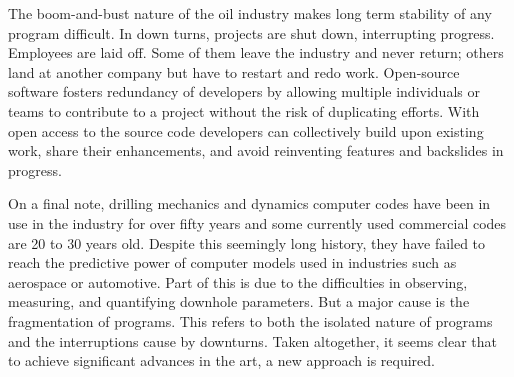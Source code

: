 The boom-and-bust nature of the oil industry makes long term stability of any program difficult.  In down turns, projects are shut down, interrupting progress.  Employees are laid off.  Some of them leave the industry and never return; others land at another company but have to restart and redo work.  Open-source software fosters redundancy of developers by allowing multiple individuals or teams to contribute to a project without the risk of duplicating efforts.  With open access to the source code developers can collectively build upon existing work, share their enhancements, and avoid reinventing features and backslides in progress.


On a final note, drilling mechanics and dynamics computer codes have been in use in the industry for over fifty years and some currently used commercial codes are 20 to 30 years old.  Despite this seemingly long history, they have failed to reach the predictive power of computer models used in industries such as aerospace or automotive.  Part of this is due to the difficulties in observing, measuring, and quantifying downhole parameters.  But a major cause is the fragmentation of programs.  This refers to both the isolated nature of programs and the interruptions cause by downturns.  Taken altogether, it seems clear that to achieve significant advances in the art, a new approach is required.


